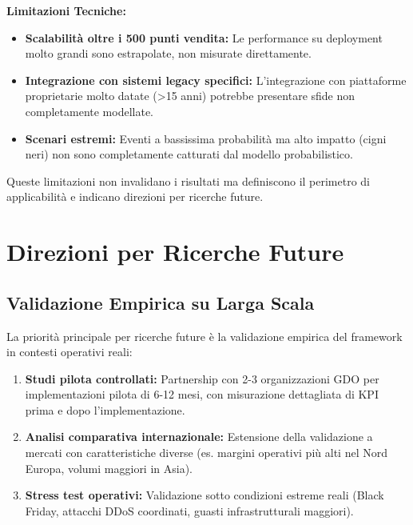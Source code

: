 \textbf{Limitazioni Tecniche:}
\begin{itemize}
\item \textbf{Scalabilità oltre i 500 punti vendita:} Le performance su deployment molto grandi sono estrapolate, non misurate direttamente.

\item \textbf{Integrazione con sistemi legacy specifici:} L'integrazione con piattaforme proprietarie molto datate (>15 anni) potrebbe presentare sfide non completamente modellate.

\item \textbf{Scenari estremi:} Eventi a bassissima probabilità ma alto impatto (cigni neri) non sono completamente catturati dal modello probabilistico.
\end{itemize}

Queste limitazioni non invalidano i risultati ma definiscono il perimetro di applicabilità e indicano direzioni per ricerche future.

\section{\texorpdfstring{Direzioni per Ricerche Future}{5.7 - Direzioni per Ricerche Future}}
\label{sec:5.7}

\subsection{\texorpdfstring{Validazione Empirica su Larga Scala}{5.7.1 - Validazione Empirica su Larga Scala}}
\label{subsec:5.7.1}

La priorità principale per ricerche future è la validazione empirica del framework in contesti operativi reali:

\begin{enumerate}
\item \textbf{Studi pilota controllati:} Partnership con 2-3 organizzazioni GDO per implementazioni pilota di 6-12 mesi, con misurazione dettagliata di KPI prima e dopo l'implementazione.

\item \textbf{Analisi comparativa internazionale:} Estensione della validazione a mercati con caratteristiche diverse (es. margini operativi più alti nel Nord Europa, volumi maggiori in Asia).

\item \textbf{Stress test operativi:} Validazione sotto condizioni estreme reali (Black Friday, attacchi DDoS coordinati, guasti infrastrutturali maggiori).
\end{enumerate}

